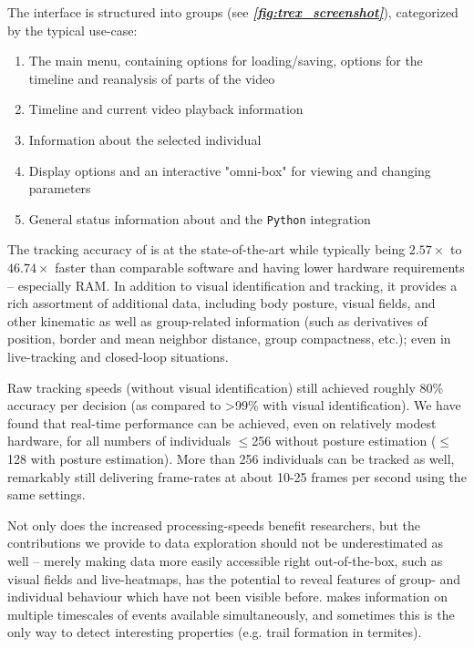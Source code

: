 \documentclass[9pt,lineno]{elife}
\newcommand{\figref}[1]{\textit{\textbf{\ref{#1}}}}
\newcommand{\TRex}{\protect\path{TRex}}
\begin{document}
The interface is structured into groups (see \figref{fig:trex_screenshot}), categorized by the typical use-case:

\begin{enumerate}
    \item The main menu, containing options for loading/saving, options for the timeline and reanalysis of parts of the video
    \item Timeline and current video playback information
    \item Information about the selected individual
    \item Display options and an interactive "omni-box" for viewing and changing parameters
    \item General status information about \TRex{} and the \texttt{Python} integration
\end{enumerate}

The tracking accuracy of \TRex{} is at the state-of-the-art while typically being $2.57\times$ to $46.74\times$ faster than comparable software and having lower hardware requirements -- {\color{blue} especially} RAM. In addition to visual identification and tracking, it provides a rich assortment of additional data, including body posture, visual fields, and other kinematic as well as group-related information (such as derivatives of position, border and mean neighbor distance, group compactness, etc.); even in live-tracking and closed-loop situations. 

Raw tracking speeds (without visual identification) still achieved roughly 80\% accuracy per decision (as compared to >99\% with visual identification). We have found that real-time performance can be achieved, even on relatively modest hardware, for all numbers of individuals $\leq$256 without posture estimation ($\leq$ 128 with posture estimation). More than 256 individuals can be tracked as well, remarkably still delivering frame-rates at about 10-25 frames per second using the same settings.

Not only does the increased processing-speeds benefit researchers, but the contributions we provide to data exploration should not be underestimated as well -- merely making data more easily accessible right out-of-the-box, such as visual fields and live-heatmaps, has the potential to reveal features of group- and individual behaviour which have not been visible before. \TRex{} makes information on multiple timescales of events available simultaneously, and sometimes this is the only way to detect interesting properties (e.g. trail formation in termites).
\end{document}
